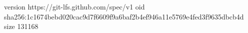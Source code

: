version https://git-lfs.github.com/spec/v1
oid sha256:1c1674bebd020cac9d7f6609f9a6baf2b4ef946a11e5769e4fed3f9635dbcb4d
size 131168
